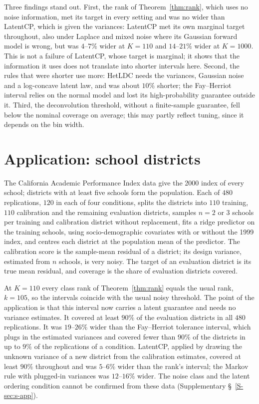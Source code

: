\documentclass[12pt]{article}
\theoremstyle{definition}
\begin{document}
Three findings stand out. First, the rank of Theorem~\ref{thm:rank}, which uses no noise information, met its target in every setting and was no wider than LatentCP, which is given the variances: LatentCP met its own marginal target throughout, also under Laplace and mixed noise where its Gaussian forward model is wrong, but was $4$--$7\%$ wider at $K = 110$ and $14$--$21\%$ wider at $K = 1000$. This is not a failure of LatentCP, whose target is marginal; it shows that the information it uses does not translate into shorter intervals here. Second, the rules that were shorter use more: HetLDC needs the variances, Gaussian noise and a log-concave latent law, and was about $10\%$ shorter; the Fay--Herriot interval relies on the normal model and lost its high-probability guarantee outside it. Third, the deconvolution threshold, without a finite-sample guarantee, fell below the nominal coverage on average; this may partly reflect tuning, since it depends on the bin width.

\section{Application: school districts}\label{sec:application}

The California Academic Performance Index data \citep{lumley2004} give the 2000 index of every school; districts with at least five schools form the population. Each of $480$ replications, $120$ in each of four conditions, splits the districts into $110$ training, $110$ calibration and the remaining evaluation districts, samples $n = 2$ or $3$ schools per training and calibration district without replacement, fits a ridge predictor on the training schools, using socio-demographic covariates with or without the 1999 index, and centres each district at the population mean of the predictor. The calibration score is the sample-mean residual of a district; its design variance, estimated from $n$ schools, is very noisy. The target of an evaluation district is its true mean residual, and coverage is the share of evaluation districts covered.

At $K = 110$ every class rank of Theorem~\ref{thm:rank} equals the usual rank, $k = 105$, so the intervals coincide with the usual noisy threshold. The point of the application is that this interval now carries a latent guarantee and needs no variance estimates. It covered at least $90\%$ of the evaluation districts in all $480$ replications. It was $19$--$26\%$ wider than the Fay--Herriot tolerance interval, which plugs in the estimated variances and covered fewer than $90\%$ of the districts in up to $9\%$ of the replications of a condition. LatentCP, applied by drawing the unknown variance of a new district from the calibration estimates, covered at least $90\%$ throughout and was $5$--$6\%$ wider than the rank's interval; the Markov rule with plugged-in variances was $12$--$16\%$ wider. The noise class and the latent ordering condition cannot be confirmed from these data (Supplementary \S~\ref{S-sec:s-app}).
\end{document}
